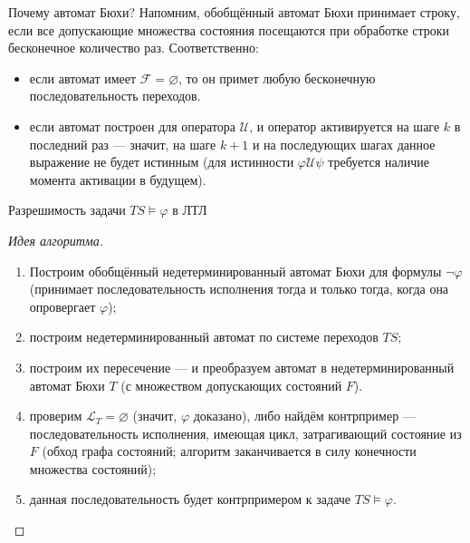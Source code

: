 \documentclass[aspectratio=169,dvipsnames,usenames]{beamer}
\begin{document}
\begin{frame}{Почему автомат Бюхи?}
Напомним, обобщённый автомат Бюхи принимает строку, если все допускающие множества состояния 
посещаются при обработке строки бесконечное количество раз. Соответственно:

\begin{itemize}
\item если автомат имеет $\mathcal{F} = \varnothing$, то он примет любую
бесконечную последовательность переходов.
\item если автомат построен для оператора $\mathcal{U}$, и оператор активируется
на шаге $k$ в последний раз --- значит, на шаге $k+1$ и на последующих шагах
данное выражение не будет истинным (для истинности $\varphi\mathcal{U}\psi$ требуется
наличие момента активации в будущем).
\end{itemize}
\end{frame}

\begin{frame}{Разрешимость задачи $TS \models \varphi$ в ЛТЛ}

\begin{proof}[Идея алгоритма]
\begin{enumerate}
\item Построим обобщённый недетерминированный автомат Бюхи для формулы $\neg\varphi$
(принимает последовательность исполнения тогда и только тогда, когда она 
опровергает $\varphi$);
\item построим недетерминированный автомат по системе переходов $TS$;
\item построим их пересечение --- и преобразуем автомат в недетерминированный автомат Бюхи $T$
(с множеством допускающих состояний $F$).
\item проверим $\mathcal{L}_T = \varnothing$ (значит, $\varphi$ доказано), 
либо найдём контрпример --- последовательность исполнения, имеющая цикл, затрагивающий
состояние из $F$ (обход графа состояний; алгоритм заканчивается в силу конечности
множества состояний);
\item данная последовательность будет контрпримером к задаче $TS \models \varphi$.
\end{enumerate}
\end{proof}
\end{frame}
\end{document}
